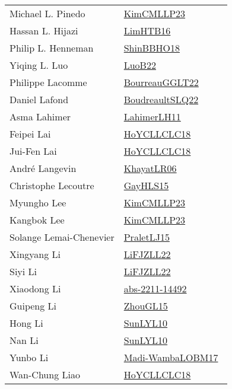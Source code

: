 {\begin{longtable}{p{4cm}p{20cm}}
Michael L. Pinedo & \href{papers/KimCMLLP23.pdf}{KimCMLLP23}~\cite{KimCMLLP23}\\
Hassan L. Hijazi & \href{papers/LimHTB16.pdf}{LimHTB16}~\cite{LimHTB16}\\
Philip L. Henneman & \href{articles/ShinBBHO18.pdf}{ShinBBHO18}~\cite{ShinBBHO18}\\
Yiqing L. Luo & \href{papers/LuoB22.pdf}{LuoB22}~\cite{LuoB22}\\
Philippe Lacomme & \href{articles/BourreauGGLT22.pdf}{BourreauGGLT22}~\cite{BourreauGGLT22}\\
Daniel Lafond & \href{papers/BoudreaultSLQ22.pdf}{BoudreaultSLQ22}~\cite{BoudreaultSLQ22}\\
Asma Lahimer & \href{papers/LahimerLH11.pdf}{LahimerLH11}~\cite{LahimerLH11}\\
Feipei Lai & \href{papers/HoYCLLCLC18.pdf}{HoYCLLCLC18}~\cite{HoYCLLCLC18}\\
Jui{-}Fen Lai & \href{papers/HoYCLLCLC18.pdf}{HoYCLLCLC18}~\cite{HoYCLLCLC18}\\
Andr{\'{e}} Langevin & \href{articles/KhayatLR06.pdf}{KhayatLR06}~\cite{KhayatLR06}\\
Christophe Lecoutre & \href{papers/GayHLS15.pdf}{GayHLS15}~\cite{GayHLS15}\\
Myungho Lee & \href{papers/KimCMLLP23.pdf}{KimCMLLP23}~\cite{KimCMLLP23}\\
Kangbok Lee & \href{papers/KimCMLLP23.pdf}{KimCMLLP23}~\cite{KimCMLLP23}\\
Solange Lemai{-}Chenevier & \href{papers/PraletLJ15.pdf}{PraletLJ15}~\cite{PraletLJ15}\\
Xingyang Li & \href{papers/LiFJZLL22.pdf}{LiFJZLL22}~\cite{LiFJZLL22}\\
Siyi Li & \href{papers/LiFJZLL22.pdf}{LiFJZLL22}~\cite{LiFJZLL22}\\
Xiaodong Li & \href{articles/abs-2211-14492.pdf}{abs-2211-14492}~\cite{abs-2211-14492}\\
Guipeng Li & \href{papers/ZhouGL15.pdf}{ZhouGL15}~\cite{ZhouGL15}\\
Hong Li & \href{papers/SunLYL10.pdf}{SunLYL10}~\cite{SunLYL10}\\
Nan Li & \href{papers/SunLYL10.pdf}{SunLYL10}~\cite{SunLYL10}\\
Yunbo Li & \href{papers/Madi-WambaLOBM17.pdf}{Madi-WambaLOBM17}~\cite{Madi-WambaLOBM17}\\
Wan{-}Chung Liao & \href{papers/HoYCLLCLC18.pdf}{HoYCLLCLC18}~\cite{HoYCLLCLC18}\\

\end{longtable}}
